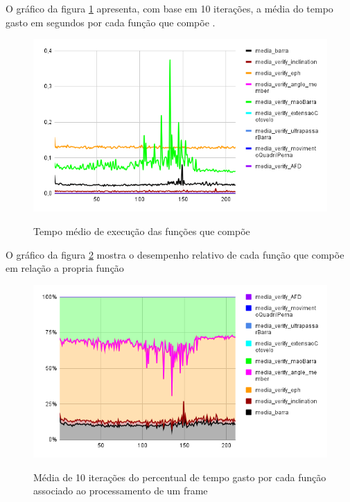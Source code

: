 O gráfico da figura \ref{graf:G13} apresenta, com base em 10 iterações, a média do tempo gasto em segundos por cada função que compõe .

\begin{figure}[H]
	\centering
	\caption{Tempo médio de execução das funções que compõe }
	\includegraphics[scale=0.7]{figuras/grafico/comp_process_cell_2.png}
	\label{graf:G13}
\end{figure}


O gráfico da figura \ref{graf:G14} mostra o desempenho relativo de cada função que compõe  em relação a propria função 

\begin{figure}[H]
	\centering
	\caption{Média de 10 iterações do percentual de tempo gasto por cada função associado ao processamento de um frame}
	\includegraphics[scale=0.7]{figuras/grafico/comp_process_cell_1.png}
	\label{graf:G14}
\end{figure}






